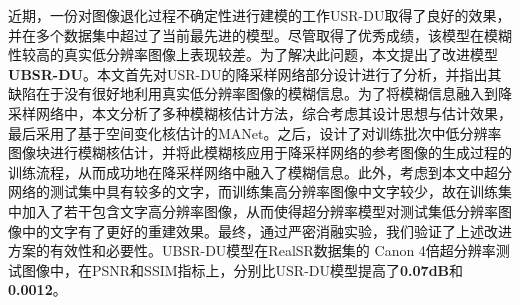 近期，一份对图像退化过程不确定性进行建模的工作USR-DU取得了良好的效果，并在多个数据集中超过了当前最先进的模型。尽管取得了优秀成绩，该模型在模糊性较高的真实低分辨率图像上表现较差。为了解决此问题，本文提出了改进模型\textbf{UBSR-DU}。本文首先对USR-DU的降采样网络部分设计进行了分析，并指出其缺陷在于没有很好地利用真实低分辨率图像的模糊信息。为了将模糊信息融入到降采样网络中，本文分析了多种模糊核估计方法，综合考虑其设计思想与估计效果，最后采用了基于空间变化核估计的MANet。之后，设计了对训练批次中低分辨率图像块进行模糊核估计，并将此模糊核应用于降采样网络的参考图像的生成过程的训练流程，从而成功地在降采样网络中融入了模糊信息。此外，考虑到本文中超分网络的测试集中具有较多的文字，而训练集高分辨率图像中文字较少，故在训练集中加入了若干包含文字高分辨率图像，从而使得超分辨率模型对测试集低分辨率图像中的文字有了更好的重建效果。最终，通过严密消融实验，我们验证了上述改进方案的有效性和必要性。UBSR-DU模型在RealSR数据集的 Canon 4倍超分辨率测试图像中，在PSNR和SSIM指标上，分别比USR-DU模型提高了\textbf{0.07dB}和\textbf{0.0012}。
